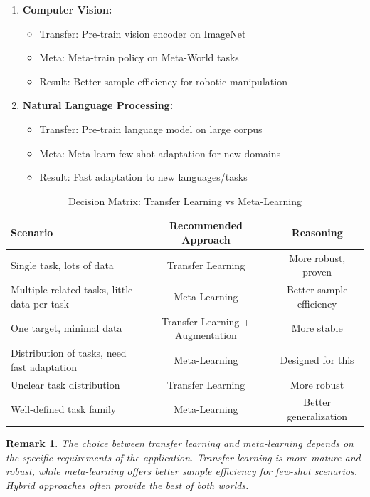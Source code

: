 \documentclass[12pt]{article}
\newtheorem{remark}{Remark}
\begin{document}
{{			\begin{enumerate}
				\item \textbf{Computer Vision:}
				\begin{itemize}
					\item Transfer: Pre-train vision encoder on ImageNet
					\item Meta: Meta-train policy on Meta-World tasks
					\item Result: Better sample efficiency for robotic manipulation
				\end{itemize}
				
				\item \textbf{Natural Language Processing:}
				\begin{itemize}
					\item Transfer: Pre-train language model on large corpus
					\item Meta: Meta-learn few-shot adaptation for new domains
					\item Result: Fast adaptation to new languages/tasks
				\end{itemize}
			\end{enumerate}
			
			\begin{table}[H]
			\centering
			\caption{Decision Matrix: Transfer Learning vs Meta-Learning}
			\begin{tabular}{@{}lcc@{}}
			\toprule
			\textbf{Scenario} & \textbf{Recommended Approach} & \textbf{Reasoning} \\
			\midrule
			Single task, lots of data & Transfer Learning & More robust, proven \\
			Multiple related tasks, little data per task & Meta-Learning & Better sample efficiency \\
			One target, minimal data & Transfer Learning + Augmentation & More stable \\
			Distribution of tasks, need fast adaptation & Meta-Learning & Designed for this \\
			Unclear task distribution & Transfer Learning & More robust \\
			Well-defined task family & Meta-Learning & Better generalization \\
			\bottomrule
			\end{tabular}
			\label{tab:decision_matrix}
			\end{table}
			
			\begin{remark}
			The choice between transfer learning and meta-learning depends on the specific requirements of the application. Transfer learning is more mature and robust, while meta-learning offers better sample efficiency for few-shot scenarios. Hybrid approaches often provide the best of both worlds.
			\end{remark}
			
}}
\end{document}
